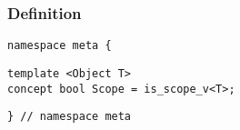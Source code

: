 
\subsubsection{Definition}

\begin{verbatim}
namespace meta {
\end{verbatim}
\begin{verbatim}
template <Object T>
concept bool Scope = is_scope_v<T>;

\end{verbatim}
\begin{verbatim}
} // namespace meta
\end{verbatim}
